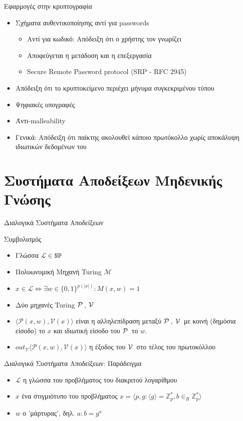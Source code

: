 \documentclass[10pt,handout]{beamer}
\begin{document}
\begin{frame}{Εφαρμογές στην κρυπτογραφία}
\begin{itemize}
\item Σχήματα αυθεντικοποίησης αντί για passwords
\begin{itemize}
\item Αντί για κωδικό: Απόδειξη ότι ο χρήστης τον γνωρίζει
\item Αποφεύγεται η μετάδοση και η επεξεργασία
\item Secure Remote Password protocol (SRP  - RFC 2945)
\end{itemize}
\pause
\item Απόδειξη ότι το κρυπτοκείμενο περιέχει μήνυμα συγκεκριμένου τύπου
\pause
\item Ψηφιακές υπογραφές
\item Άντι-malleability
\pause 
\item Γενικά: Απόδειξη ότι παίκτης ακολουθεί κάποιο πρωτόκολλο χωρίς αποκάλυψη ιδιωτικών δεδομένων του
\end{itemize}
\end{frame}

\section{Συστήματα Αποδείξεων Μηδενικής Γνώσης}
\begin{frame}{Διαλογικά Συστήματα Αποδείξεων}
\begin{block}{Συμβολισμός}
\begin{itemize}
\item Γλώσσα $ \mathcal{L} \in \mathtt{NP}$ \pause
\item Πολυωνυμική Mηχανή Turing $\mathcal{M}$ \pause
\item $x \in \mathcal{L} \Leftrightarrow \exists w \in \{0,1\}^{p(|x|)}: M(x,w) = 1$ \pause
\item Δύο μηχανές Turing  $\mathcal{P}\,$, $\mathcal{V}\,$ \pause
\item $\langle \mathcal{P}(x,w), \mathcal{V}(x) \rangle$ είναι η αλληλεπίδραση μεταξύ  $\mathcal{P}\,$, $\mathcal{V}\,$ με κοινή (δημόσια είσοδο) το $x$ και ιδιωτική είσοδο του $\mathcal{P}\,$ το $w$. \pause
\item $out_\mathcal{V}{\langle \mathcal{P}(x,w), \mathcal{V}(x) \rangle}$ η έξοδος του $\mathcal{V}\,$ στο τέλος του πρωτοκόλλου
\end{itemize}
\end{block}
\end{frame}

\begin{frame}{Διαλογικά Συστήματα Αποδείξεων: Παράδειγμα}
\begin{itemize}
\item $\mathcal{L}$ η γλώσσα του προβλήματος του διακριτού λογαρίθμου \pause
\item $x$ ένα στιγμιότυπο του προβλήματος $x=\langle p,g: \langle g \rangle = \mathbb{Z}_p^*, b  \in_R \mathbb{Z}_p^* \rangle$ \pause
\item $w$ ο 'μάρτυρας', δηλ. $a: b = g^a$
\end{itemize}
\end{frame}
\end{document}
